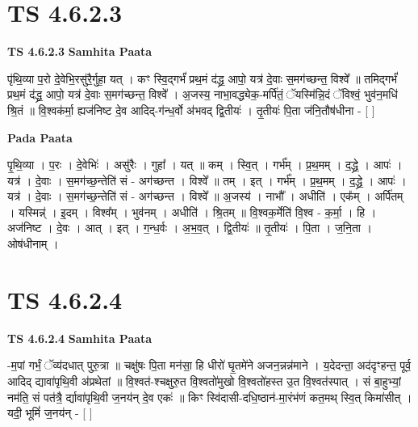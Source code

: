 \documentclass[17pt]{extarticle}
\begin{document}
\section{ TS 4.6.2.3 }

\textbf{TS 4.6.2.3 } \newline
\textbf{Samhita Paata} \newline

पृ॑थि॒व्या प॒रो दे॒वेभि॒रसु॑रै॒र्गुहा॒ यत् । कꣳ स्वि॒द्गर्भं॑ प्रथ॒मं द॑द्ध्र॒ आपो॒ यत्र॑ दे॒वाः स॒मग॑च्छन्त॒ विश्वे᳚ ॥ तमिद्गर्भं॑ प्रथ॒मं द॑द्ध्र॒ आपो॒ यत्र॑ दे॒वाः स॒मग॑च्छन्त॒ विश्वे᳚ । अ॒जस्य॒ नाभा॒वद्ध्येक॒-मर्पि॑तं॒ ॅयस्मि॑न्नि॒दं ॅविश्वं॒ भुव॑न॒मधि॑ श्रि॒तं ॥ वि॒श्वक॑र्मा॒ ह्यज॑निष्ट दे॒व आदिद्-ग॑न्ध॒र्वो अ॑भवद् द्वि॒तीयः॑ । तृ॒तीयः॑ पि॒ता ज॑नि॒तौष॑धीना - [  ] \newline

\textbf{Pada Paata} \newline

पृ॒थि॒व्या । प॒रः । दे॒वेभिः॑ । असु॑रैः । गुहा᳚ । यत् ॥ कम् । स्वि॒त् । गर्भ᳚म् । प्र॒थ॒मम् । द॒द्ध्रे॒ । आपः॑ । यत्र॑ । दे॒वाः । स॒मग॑च्छ॒न्तेति॑ सं - अग॑च्छन्त । विश्वे᳚ ॥ तम् । इत् । गर्भ᳚म् । प्र॒थ॒मम् । द॒द्ध्रे॒ । आपः॑ । यत्र॑ । दे॒वाः । स॒मग॑च्छ॒न्तेति॑ सं - अग॑च्छन्त । विश्वे᳚ ॥ अ॒जस्य॑ । नाभौ᳚ । अधीति॑ । एक᳚म् । अर्पि॑तम् । यस्मिन्न्॑ । इ॒दम् । विश्व᳚म् । भुव॑नम् । अधीति॑ । श्रि॒तम् ॥ वि॒श्वक॒र्मेति॑ वि॒श्व - क॒र्मा॒ । हि । अज॑निष्ट । दे॒वः । आत् । इत् । ग॒न्ध॒र्वः । अ॒भ॒व॒त् । द्वि॒तीयः॑ ॥ तृ॒तीयः॑ । पि॒ता । ज॒नि॒ता । ओष॑धीनाम् ।  \newline





\section{ TS 4.6.2.4 }

\textbf{TS 4.6.2.4 } \newline
\textbf{Samhita Paata} \newline

-म॒पां गर्भं॒ ॅव्य॑दधात् पुरु॒त्रा ॥ चक्षु॑षः पि॒ता मन॑सा॒ हि धीरो॑ घृ॒तमे॑ने अजन॒न्नन्न॑माने । य॒देदन्ता॒ अद॑दृꣳहन्त॒ पूर्व॒ आदिद् द्यावा॑पृथि॒वी अ॑प्रथेतां ॥ वि॒श्वत॑-श्चक्षुरु॒त वि॒श्वतो॑मुखो वि॒श्वतो॑हस्त उ॒त वि॒श्वत॑स्पात् । सं बा॒हुभ्यां॒ नम॑ति॒ सं पत॑त्रै॒ र्द्यावा॑पृथि॒वी ज॒नय॑न् दे॒व एकः॑ ॥ किꣳ स्वि॑दासी-दधि॒ष्ठान॑-मा॒रंभ॑णं कत॒मथ् स्वि॒त् किमा॑सीत् । यदी॒ भूमिं॑ ज॒नय॑न् - [  ] \newline
\end{document}

